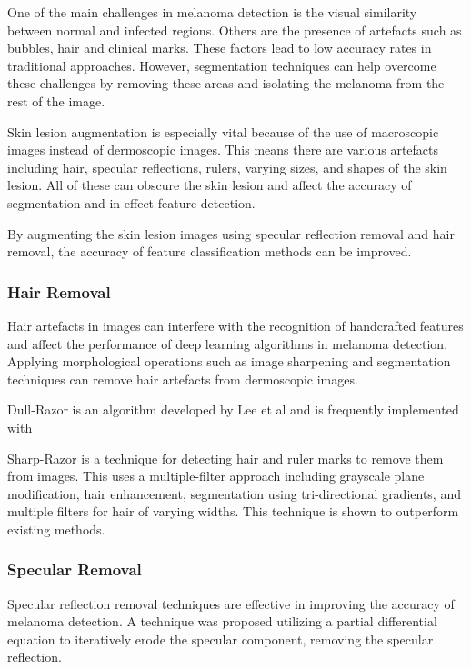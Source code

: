 One of the main challenges in melanoma detection is the visual similarity between normal and infected regions. Others are the presence of artefacts such as bubbles, hair and clinical marks\cite{Albahli2020}. These factors lead to low accuracy rates in traditional approaches. However, segmentation techniques can help overcome these challenges by removing these areas and isolating the melanoma from the rest of the image.

Skin lesion augmentation is especially vital because of the use of macroscopic images instead of dermoscopic images. This means there are various artefacts including hair, specular reflections, rulers, varying sizes, and shapes of the skin lesion. All of these can obscure the skin lesion and affect the accuracy of segmentation\cite{Unver2019} and in effect feature detection.

By augmenting the skin lesion images using specular reflection removal and hair removal, the accuracy of feature classification methods can be improved\cite{kasmi2023}. 



\subsubsection{Hair Removal}
Hair artefacts in images can interfere with the recognition of handcrafted features and affect the performance of deep learning algorithms in melanoma detection\cite{kasmi2023}. Applying morphological operations such as image sharpening and segmentation techniques can remove hair artefacts from dermoscopic images\cite{kasmi2023}.

Dull-Razor is an algorithm developed by Lee et al\cite{Lee1997} and is frequently implemented with 

Sharp-Razor\cite{kasmi2023} is a technique for detecting hair and ruler marks to remove them from images. This uses a multiple-filter approach including grayscale plane modification, hair enhancement, segmentation using tri-directional gradients, and multiple filters for hair of varying widths. This technique is shown to outperform existing methods.

\subsubsection{Specular Removal}
Specular reflection removal techniques are effective in improving the accuracy of melanoma detection\cite{Shen2009}. A technique was proposed utilizing a partial differential equation to iteratively erode the specular component, removing the specular reflection\cite{Shen2009}.


